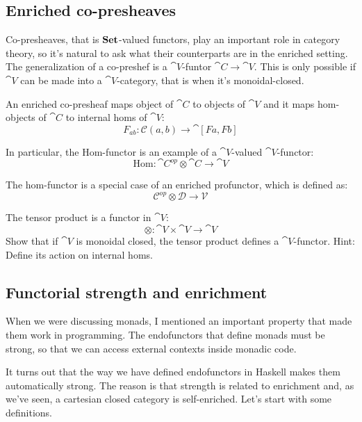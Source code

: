 \documentclass[DaoFP]{subfiles}
\begin{document}
\subsection{Enriched co-presheaves}
Co-presheaves, that is $\mathbf{Set}$-valued functors, play an important role in category theory, so it's natural to ask what their counterparts are in the enriched setting. The generalization of a co-preshef is a $\cat V$-funtor $\cat C \to \cat V$. This is only possible if $\cat V$ can be made into a $\cat V$-category, that is when it's monoidal-closed. 

An enriched co-presheaf maps object of $\cat C$ to objects of $\cat V$ and it maps hom-objects of $\cat C$ to internal homs of $\cat V$:
\[ F_{a b} \colon \mathcal C (a, b) \to \cat [F a, F b] \]

In particular, the $\text{Hom}$-functor is an example of a $\cat V$-valued $\cat V$-functor:
\[ \text{Hom} \colon \cat C^{op} \otimes \cat C \to \cat V \]

The hom-functor is a special case of an enriched profunctor, which is defined as:
\[ \mathcal C^{op} \otimes \mathcal D \to \mathcal V \]

\begin{exercise}
The tensor product is a functor in $\cat V$:
\[ \otimes \colon \cat V \times \cat V \to \cat V \]
Show that if $\cat V$ is monoidal closed, the tensor product defines a $\cat V$-functor. Hint: Define its action on internal homs.
\end{exercise}

\subsection{Functorial strength and enrichment}

When we were discussing monads, I mentioned an important property that made them work in programming. The endofunctors that define monads must be strong, so that we can access external contexts inside monadic code. 

It turns out that the way we have defined endofunctors in Haskell makes them automatically strong. The reason is that strength is related to enrichment and, as we've seen, a cartesian closed category is self-enriched. Let's start with some definitions.
\end{document}

